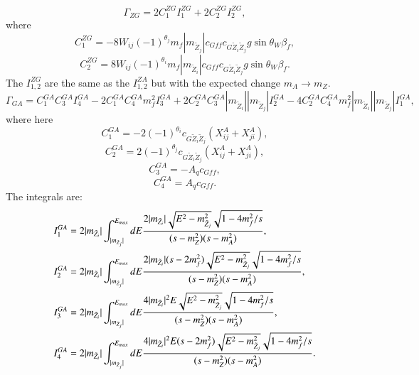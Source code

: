 \documentclass[final,3p,times,pdflatex]{elsarticle}
\begin{document}
\begin{equation}
\Gamma_{Z G} = 2C_{1}^{Z G}I_{1}^{Z G} + 2C_{2}^{Z G}I_{2}^{Z G},
\end{equation}
where
\begin{equation}
C_{1}^{Z G} = -8W_{ij}(-1)^{\theta_j}m_{f}|m_{\tilde{Z}_j}|c_{G f f} c_{G \tilde{Z}_i \tilde{Z}_j} g \sin\theta_W \beta_{f},
\end{equation}
\begin{equation}
C_{2}^{Z G} = 8W_{ij}(-1)^{\theta_i}m_{f}|m_{\tilde{Z}_i}|c_{G f f} c_{G \tilde{Z}_i \tilde{Z}_j} g \sin\theta_W \beta_{f}.
\end{equation}
The $I_{1,2}^{Z G}$ are the same as the $I_{1,2}^{Z A}$ but with the expected change $m_{A} \rightarrow m_{Z}$.
\begin{equation}
\Gamma_{G A} = C_{1}^{G A}C_{3}^{G A}I_{4}^{G A} - 2C_{1}^{GA}C_{4}^{GA}m_{f}^2I_{3}^{G A} + 2C_{2}^{G A} C_{3}^{G A}|m_{\tilde{Z}_i}||m_{\tilde{Z}_j}|I_{2}^{G A} - 4C_{2}^{G A}C_{4}^{G A}m_{f}^2|m_{\tilde{Z}_i}||m_{\tilde{Z}_j}|I_{1}^{G A},
\end{equation}
where here
\begin{equation}
C_{1}^{G A} = -2(-1)^{\theta_i}c_{G \tilde{Z}_i \tilde{Z}_j}(X_{ij}^A + X_{ji}^A),
\end{equation}
\begin{equation}
C_{2}^{G A} = 2(-1)^{\theta_j}c_{G \tilde{Z}_i \tilde{Z}_j}(X_{ij}^A + X_{ji}^A),
\end{equation}
\begin{equation}
C_{3}^{G A} = -A_{q} c_{G f f},
\end{equation}
\begin{equation}
C_{4}^{G A} = A_{q} c_{G f f}.
\end{equation}
The integrals are:
\begin{align}
I_{1}^{G A} &= 2|m_{\tilde{Z}_i}|\int_{|m_{\tilde{Z}_j}|}^{E_{max}}dE {2|m_{\tilde{Z}_i}|\sqrt{E^2 - m_{\tilde{Z}_j}^2}\sqrt{1-4m_{f}^2/s} \over (s-m_{Z}^2)(s-m_{A}^2)}, \\
I_{2}^{G A} &= 2|m_{\tilde{Z}_i}|\int_{|m_{\tilde{Z}_j}|}^{E_{max}}dE {2|m_{\tilde{Z}_i}| (s - 2m_{f}^2)\sqrt{E^2 - m_{\tilde{Z}_j}^2}\sqrt{1-4m_{f}^2/s} \over (s-m_{Z}^2)(s-m_{A}^2)}, \\
I_{3}^{G A} &= 2|m_{\tilde{Z}_i}|\int_{|m_{\tilde{Z}_j}|}^{E_{max}}dE {4|m_{\tilde{Z}_i}|^2 E \sqrt{E^2 - m_{\tilde{Z}_j}^2}\sqrt{1-4m_{f}^2/s} \over (s-m_{Z}^2)(s-m_{A}^2)}, \\
I_{4}^{G A} &= 2|m_{\tilde{Z}_i}|\int_{|m_{\tilde{Z}_j}|}^{E_{max}}dE {4|m_{\tilde{Z}_i}|^2 E (s-2m_{f}^2)\sqrt{E^2 - m_{\tilde{Z}_j}^2}\sqrt{1-4m_{f}^2/s} \over (s-m_{Z}^2)(s-m_{A}^2)}.
\end{align}
\end{document}
